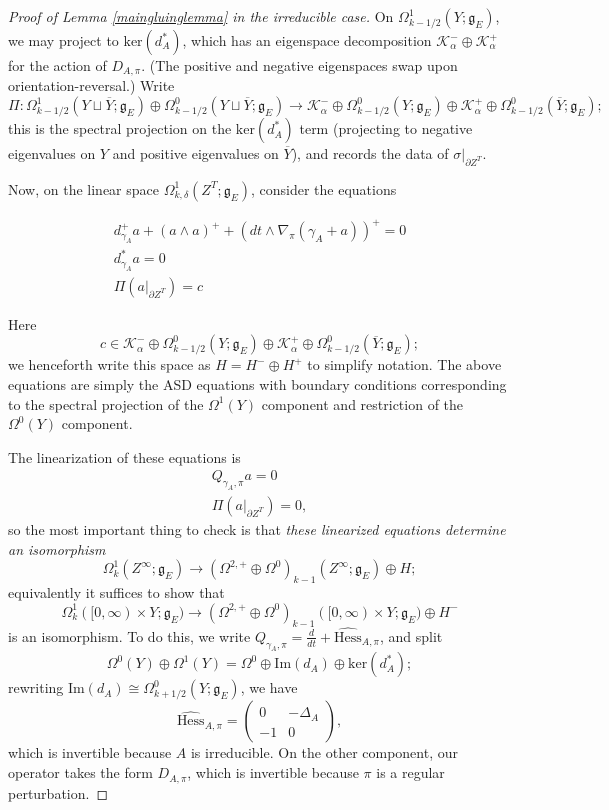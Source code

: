 \documentclass[10pt,a4paper]{amsart}
\theoremstyle{definition}
\theoremstyle{remark}
\numberwithin{figure}{qchap}
\begin{document}
\begin{proof}[Proof of Lemma \ref{maingluinglemma} in the irreducible case]
On $\Omega^1_{k-1/2}(Y;\mathfrak g_E)$, we may project to $\text{ker}(d_A^*)$, which has an eigenspace decomposition $\mathcal K^-_\alpha \oplus \mathcal K^+_\alpha$ for the action of $D_{A,\pi}$. (The positive and negative eigenspaces swap upon orientation-reversal.) Write $$\Pi: \Omega^1_{k-1/2}(Y \sqcup \overline Y; \mathfrak g_E) \oplus \Omega^0_{k-1/2}(Y \sqcup \overline Y; \mathfrak g_E) \to \mathcal K^-_\alpha \oplus \Omega^0_{k-1/2}(Y;\mathfrak g_E) \oplus \mathcal K^+_\alpha \oplus \Omega^0_{k-1/2}(\overline Y; \mathfrak g_E);$$ this is the spectral projection on the $\text{ker}(d_A^*)$ term (projecting to negative eigenvalues on $Y$ and positive eigenvalues on $\overline Y$), and records the data of $\sigma \big|_{\partial Z^T}$.

Now, on the linear space $\Omega^1_{k,\delta}(Z^T;\mathfrak g_E)$, consider the equations

\begin{align*} d_{\gamma_A}^+ a + (a \wedge a)^+ + \left(dt \wedge \nabla_\pi(\gamma_A + a)\right)^+ = 0 \\
d_{\gamma_A}^* a = 0 \\
\Pi (a \big|_{\partial Z^T}) = c \end{align*}

Here $$c \in \mathcal K^-_\alpha \oplus \Omega^0_{k-1/2}(Y;\mathfrak g_E) \oplus \mathcal K^+_\alpha \oplus \Omega^0_{k-1/2}(\overline Y; \mathfrak g_E);$$ we henceforth write this space as $H = H^- \oplus H^+$ to simplify notation. The above equations are simply the ASD equations with boundary conditions corresponding to the spectral projection of the $\Omega^1(Y)$ component and restriction of the $\Omega^0(Y)$ component.

The linearization of these equations is \begin{align*} Q_{\gamma_A, \pi} a = 0 \\
\Pi(a \big|_{\partial Z^T}) = 0,\end{align*}
so the most important thing to check is that \emph{these linearized equations determine an isomorphism} 
$$\Omega^1_{k}(Z^\infty;\mathfrak g_E) \to (\Omega^{2,+} \oplus \Omega^0)_{k-1}(Z^\infty; \mathfrak g_E) \oplus H;$$ 
equivalently it suffices to show that 
$$\Omega^1_k([0,\infty) \times Y; \mathfrak g_E) \to (\Omega^{2,+} \oplus \Omega^0)_{k-1}([0,\infty) \times Y; \mathfrak g_E) \oplus H^-$$ 
is an isomorphism. To do this, we write $Q_{\gamma_A, \pi} = \frac d{dt} + \widehat{\text{Hess}}_{A,\pi}$, and split 
$$\Omega^0(Y) \oplus \Omega^1(Y) = \Omega^0 \oplus \text{Im}(d_A) \oplus \text{ker}(d_A^*);$$ 
rewriting $\text{Im}(d_A) \cong \Omega^0_{k+1/2}(Y;\mathfrak g_E)$, we have 
$$\widehat{\text{Hess}}_{A,\pi} = \begin{pmatrix}0 & - \Delta_A \\ -1 & 0\end{pmatrix},$$
which is invertible because $A$ is irreducible. On the other component, our operator takes the form $D_{A,\pi}$, which is invertible because $\pi$ is a regular perturbation.


\end{proof}
\end{document}
